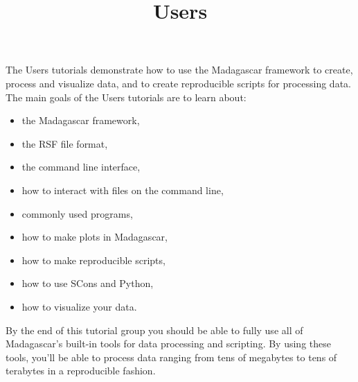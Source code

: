 \title{Users}
The Users tutorials demonstrate how to use the Madagascar framework to create, process and visualize data, and to create reproducible scripts for processing data.  The main goals of the Users tutorials are to learn about:
\begin{itemize}
    \item the Madagascar framework,
    \item the RSF file format,
    \item the command line interface,
    \item how to interact with files on the command line,
    \item commonly used programs,
    \item how to make plots in Madagascar,
    \item how to make reproducible scripts,
    \item how to use SCons and Python,
    \item how to visualize your data.
\end{itemize}
By the end of this tutorial group you should be able to fully use all of Madagascar's built-in tools for data processing and scripting.  By using these tools, you'll be able to process data ranging from tens of megabytes to tens of terabytes in a reproducible fashion.  







